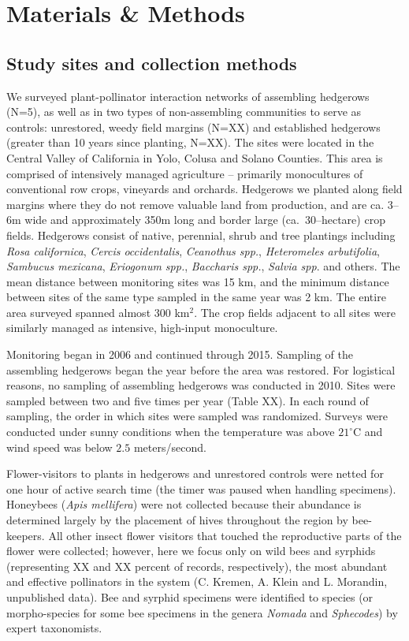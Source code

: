 \documentclass[12pt]{article}
\begin{document}
\section*{Materials \& Methods}
\label{sec:methods}

\subsection*{Study sites and collection methods}
\label{sec:study-sites}

We surveyed plant-pollinator interaction networks of assembling
hedgerows (N=5), as well as in two types of non-assembling communities
to serve as controls: unrestored, weedy field margins (N=XX) and
established hedgerows (greater than 10 years since planting,
N=XX). The sites were located in the Central Valley of California in
Yolo, Colusa and Solano Counties. This area is comprised of
intensively managed agriculture -- primarily monocultures of
conventional row crops, vineyards and orchards. Hedgerows we planted
along field margins where they do not remove valuable land from
production, and are ca. 3--6m wide and approximately 350m long and
border large (ca.\ 30--hectare) crop fields. Hedgerows consist of
native, perennial, shrub and tree plantings including \textit{Rosa
  californica}, \textit{Cercis occidentalis}, \textit{Ceanothus spp.},
\textit{Heteromeles arbutifolia}, \textit{Sambucus mexicana},
\textit{Eriogonum spp.}, \textit{Baccharis spp.}, \textit{Salvia
  spp}. and others. The mean distance between monitoring sites was 15
km, and the minimum distance between sites of the same type sampled in
the same year was 2 km.  The entire area surveyed spanned almost 300
km$^2$. The crop fields adjacent to all sites were similarly managed
as intensive, high-input monoculture.

Monitoring began in 2006 and continued through 2015. Sampling of the
assembling hedgerows began the year before the area was restored. For
logistical reasons, no sampling of assembling hedgerows was conducted
in 2010. Sites were sampled between two and five times per year (Table
XX). In each round of sampling, the order in which sites were sampled
was randomized. Surveys were conducted under sunny conditions when the
temperature was above $21^{\circ}\mathrm{C}$ and wind speed was below
$2.5$ meters/second.

Flower-visitors to plants in hedgerows and unrestored controls were
netted for one hour of active search time (the timer was paused when
handling specimens). Honeybees (\textit{Apis mellifera}) were not
collected because their abundance is determined largely by the
placement of hives throughout the region by bee-keepers. All other
insect flower visitors that touched the reproductive parts of the
flower were collected; however, here we focus only on wild bees and
syrphids (representing XX and XX percent of records, respectively),
the most abundant and effective pollinators in the system (C. Kremen,
A. Klein and L. Morandin, unpublished data). Bee and syrphid specimens
were identified to species (or morpho-species for some bee specimens
in the genera \textit{Nomada} and \textit{Sphecodes}) by expert
taxonomists.
\end{document}
